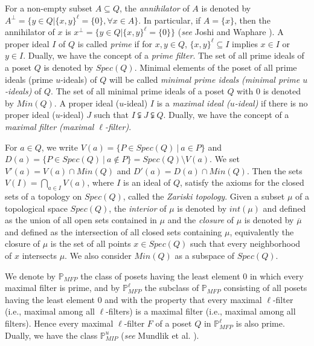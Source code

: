 \documentclass[10pt,one side,emlines]{amsart}
\theoremstyle{definition}
\begin{document}
For a non-empty subset $A \subseteq Q$, the \textit{annihilator} of $A$ is denoted by $A^{\perp }= \{y \in Q | \{x, y\}^\ell = \{0\}, \forall x \in A\}$. In particular, if $A = \{x\}$, then the annihilator of $x$ is $x^{\perp}= \{y \in Q | \{x, y\}^\ell = \{0\}\}$ (\textit{see} Joshi and Waphare \cite{JW}). A proper ideal $I$ of $Q$ is called \textit{prime} if for $x, y \in Q$, $\{x, y\}^{\ell} \subseteq I$ implies $x \in I$ or $y \in I$. Dually, we have the concept of a \textit{prime filter}. The set of all prime ideals of a poset $Q$ is denoted by $Spec(Q)$. Minimal elements of the poset of all prime ideals (prime $u$-ideals) of $Q$ will be called \textit{minimal prime ideals (minimal prime $u$-ideals)} of $Q$. The set of all minimal prime ideals of a poset $Q$ with $0$ is denoted by $Min(Q)$. A proper ideal ($u$-ideal) $I$ is a \textit{maximal ideal ($u$-ideal)} if there is no proper ideal ($u$-ideal) $J$ such that $I\subsetneqq J\subsetneqq Q$. Dually, we have the concept of a \textit{maximal filter (maximal $\ell$-filter)}.

For $a\in Q$, we write $V (a) = \{P \in Spec(Q) ~|~ a \in P\}$ and $D(a) = \{P \in Spec(Q) ~|~ a\notin P\} = Spec(Q) \setminus V (a)$. We set $V'(a)=V(a)\cap Min(Q)$ and $D'(a)=D(a)\cap Min(Q)$. Then the sets $V(I)= \bigcap_{a\in I} V(a)$, where $I$ is an ideal of $Q$, satisfy the axioms for the closed sets of a topology on $Spec(Q)$, called the \textit{Zariski topology}. Given a subset $\mu$ of a topological space $Spec(Q)$,  the \textit{interior} of $\mu$ is denoted by $int(\mu)$ and defined as the union of all open sets contained in $\mu$ and the \textit{closure} of $\mu$ is denoted by $\overline{\mu}$ and defined as the intersection of all closed sets containing $\mu$, equivalently the closure of $\mu$ is the set of all points $x\in Spec(Q)$ such that every neighborhood of $x$ intersects $\mu$. We also consider $Min(Q)$ as a subspace of $Spec(Q)$.

We denote by $\mathbb{P}_{MFP}$ the class of posets having the least element $0$ in which every maximal filter is prime, and by $\mathbb{P}^{\ell}_{MFP}$ the subclass of $\mathbb{P}_{MFP}$ consisting of all posets having the least element $0$ and with the property that every maximal $\ell$-filter (i.e., maximal among all $\ell$-filters) is a maximal filter (i.e., maximal among all filters). Hence every maximal $\ell$-filter $F$ of a poset $Q$ in $\mathbb{P}^{\ell}_{MFP}$ is also prime. Dually, we have the class $\mathbb{P}^{u}_{MIP}$ (\textit{see} Mundlik et al. \cite{MJH}).
\end{document}
